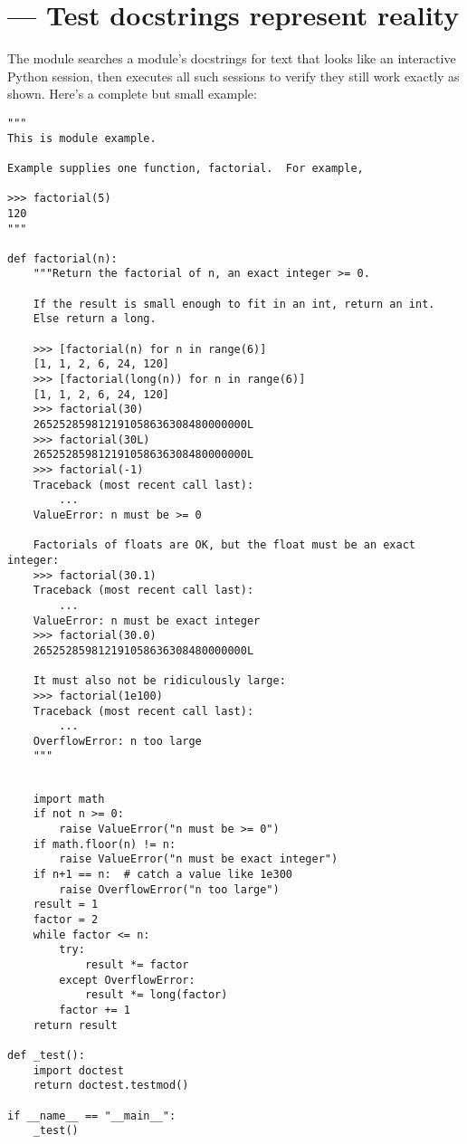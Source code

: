 \section{ ---
         Test docstrings represent reality}



The  module searches a module's docstrings for text that looks
like an interactive Python session, then executes all such sessions to verify
they still work exactly as shown.  Here's a complete but small example:

\begin{verbatim}
"""
This is module example.

Example supplies one function, factorial.  For example,

>>> factorial(5)
120
"""

def factorial(n):
    """Return the factorial of n, an exact integer >= 0.

    If the result is small enough to fit in an int, return an int.
    Else return a long.

    >>> [factorial(n) for n in range(6)]
    [1, 1, 2, 6, 24, 120]
    >>> [factorial(long(n)) for n in range(6)]
    [1, 1, 2, 6, 24, 120]
    >>> factorial(30)
    265252859812191058636308480000000L
    >>> factorial(30L)
    265252859812191058636308480000000L
    >>> factorial(-1)
    Traceback (most recent call last):
        ...
    ValueError: n must be >= 0

    Factorials of floats are OK, but the float must be an exact integer:
    >>> factorial(30.1)
    Traceback (most recent call last):
        ...
    ValueError: n must be exact integer
    >>> factorial(30.0)
    265252859812191058636308480000000L

    It must also not be ridiculously large:
    >>> factorial(1e100)
    Traceback (most recent call last):
        ...
    OverflowError: n too large
    """

\end{verbatim}
\begin{verbatim}

    import math
    if not n >= 0:
        raise ValueError("n must be >= 0")
    if math.floor(n) != n:
        raise ValueError("n must be exact integer")
    if n+1 == n:  # catch a value like 1e300
        raise OverflowError("n too large")
    result = 1
    factor = 2
    while factor <= n:
        try:
            result *= factor
        except OverflowError:
            result *= long(factor)
        factor += 1
    return result

def _test():
    import doctest
    return doctest.testmod()

if __name__ == "__main__":
    _test()
\end{verbatim}

